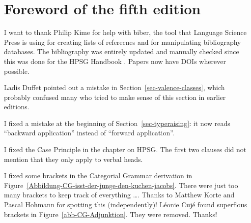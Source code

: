 
\section*{Foreword of the fifth edition}

I want to thank Philip Kime for help with biber, the tool that Language Science Press is using for
creating lists of referecnes and for manipulating bibliography databases. The bibliography was
entirely updated and manually checked since this was done for the HPSG Handbook \citep*{HPSGHandbook}. Papers
now have DOIs wherever possible.

Ladis Duffet pointed out a mistake in Section~\ref{sec-valence-classes}, which probably confused many who tried to make
sense of this section in earlier editions.









I fixed a mistake at the beginning of Section~\ref{sec-typeraising}: it now reads ``backward
application'' instead of ``forward application''.

I fixed the Case Principle in the chapter on HPSG. The first two clauses did not mention that they
only apply to verbal heads.

I fixed some brackets in the Categorial Grammar derivation in Figure~\ref{Abbildung-CG-isst-der-junge-den-kuchen-jacobs}. There were
just too many brackets to keep track of everything \ldots. Thanks to Matthew Korte and Pascal
Hohmann for spotting this (independently)!
Léonie Cujé found superflous brackets in Figure~\ref{abb-CG-Adjunktion}. They were removed. Thanks!


